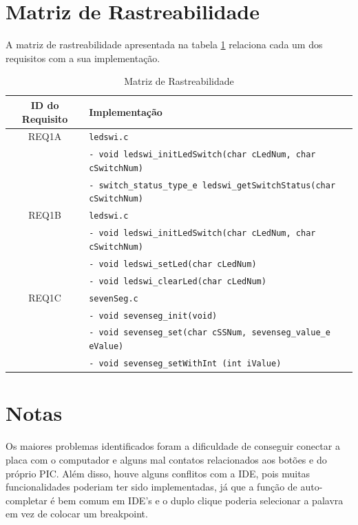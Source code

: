 \documentclass{article}
\begin{document}
\section{Matriz de Rastreabilidade}
A matriz de rastreabilidade apresentada na tabela \ref*{tab:rastreabilidade} relaciona cada um dos requisitos com a sua implementação.
\begin{table}[H]
	\centering
	\caption{Matriz de Rastreabilidade}
	\label{tab:rastreabilidade}
	\small
	\begin{tabular}{|c|l|}
		\hline \bfseries{ID do Requisito} & \bfseries{Implementação}\\ 
		\hline REQ1A 	& \texttt{ledswi.c}\\ 
						& \texttt{- void ledswi\_initLedSwitch(char cLedNum, char cSwitchNum)}\\
						& \texttt{- switch\_status\_type\_e ledswi\_getSwitchStatus(char cSwitchNum)}\\
		\hline REQ1B 	& \texttt{ledswi.c}\\ 
						& \texttt{- void ledswi\_initLedSwitch(char cLedNum, char cSwitchNum)}\\
						& \texttt{- void ledswi\_setLed(char cLedNum)}\\ 
						& \texttt{- void ledswi\_clearLed(char cLedNum)}\\
		\hline REQ1C 	& \texttt{sevenSeg.c}\\ 
						& \texttt{- void sevenseg\_init(void)}\\
						& \texttt{- void sevenseg\_set(char cSSNum, sevenseg\_value\_e eValue)}\\
						& \texttt{- void sevenseg\_setWithInt (int iValue)}\\
		\hline 
	\end{tabular} 
	\normalsize
\end{table}
\section{Notas}
Os maiores problemas identificados foram a dificuldade de conseguir conectar a placa com o computador e alguns mal contatos relacionados aos botões e do próprio PIC. Além disso, houve alguns conflitos com a IDE, pois muitas funcionalidades poderiam ter sido implementadas, já que a função de auto-completar é bem comum em IDE's e o duplo clique poderia selecionar a palavra em vez de colocar um breakpoint.
\end{document}
